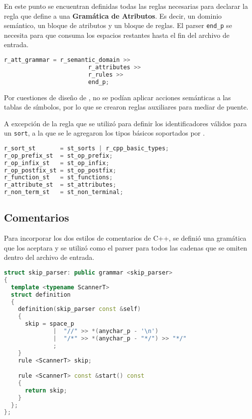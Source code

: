 En este punto se encuentran definidas todas las reglas necesarias para declarar la regla que define a una \textbf{Gramática de Atributos}. Es decir, un dominio semántico, un bloque de atributos y un bloque de reglas. El parser \texttt{end\_p} se necesita para que consuma los espacios restantes hasta el fin del archivo de entrada.

\begin{lstlisting}[language=C++, basicstyle=\scriptsize, columns=fullflexible, linewidth=7cm]
r_att_grammar = r_semantic_domain >>
                        r_attributes >>
                        r_rules >>
                        end_p;
\end{lstlisting}

Por cuestiones de diseño de \spirit, no se podían aplicar acciones semánticas a las tablas de símbolos, por lo que se crearon reglas auxiliares para mediar de puente.

A excepción de la regla que se utilizó para definir los identificadores válidos para un \texttt{sort}, a la que se le agregaron los tipos básicos soportados por \maggen.

\begin{lstlisting}[language=C++, basicstyle=\scriptsize, linewidth=9cm]
r_sort_st       = st_sorts | r_cpp_basic_types;
r_op_prefix_st  = st_op_prefix;
r_op_infix_st   = st_op_infix;
r_op_postfix_st = st_op_postfix;
r_function_st   = st_functions;
r_attribute_st  = st_attributes;
r_non_term_st   = st_non_terminal;
\end{lstlisting}

\subsection{Comentarios}

Para incorporar los dos estilos de comentarios de C++, se definió una gramática que los aceptara y se utilizó como el parser para todos las cadenas que se omiten dentro del archivo de entrada.

\begin{lstlisting}[language=C++, basicstyle=\scriptsize, columns=fullflexible, linewidth=8cm]
struct skip_parser: public grammar <skip_parser>
{
  template <typename ScannerT>
  struct definition
  {
    definition(skip_parser const &self)
    {
      skip = space_p
              |  "//" >> *(anychar_p - '\n')
              |  "/*" >> *(anychar_p - "*/") >> "*/"
              ;
    }
    rule <ScannerT> skip;

    rule <ScannerT> const &start() const
    {
      return skip;
    }
  };
};
\end{lstlisting}

